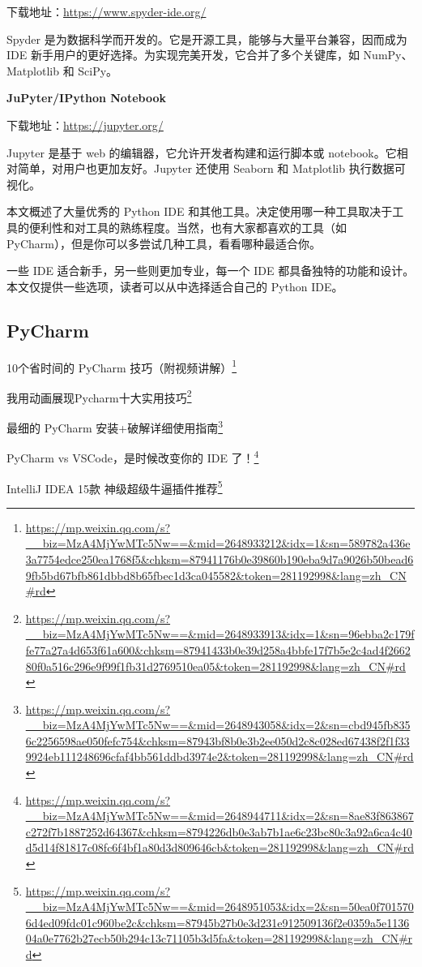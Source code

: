 \documentclass[]{ctexbook}
\renewcommand{\href}[2]{#2\footnote{\url{#1}}}
\begin{document}
下载地址：\url{https://www.spyder-ide.org/}

Spyder 是为数据科学而开发的。它是开源工具，能够与大量平台兼容，因而成为 IDE 新手用户的更好选择。为实现完美开发，它合并了多个关键库，如 NumPy、Matplotlib 和 SciPy。

\textbf{JuPyter/IPython Notebook}

下载地址：\url{https://jupyter.org/}

Jupyter 是基于 web 的编辑器，它允许开发者构建和运行脚本或 notebook。它相对简单，对用户也更加友好。Jupyter 还使用 Seaborn 和 Matplotlib 执行数据可视化。

本文概述了大量优秀的 Python IDE 和其他工具。决定使用哪一种工具取决于工具的便利性和对工具的熟练程度。当然，也有大家都喜欢的工具（如 PyCharm），但是你可以多尝试几种工具，看看哪种最适合你。

一些 IDE 适合新手，另一些则更加专业，每一个 IDE 都具备独特的功能和设计。本文仅提供一些选项，读者可以从中选择适合自己的 Python IDE。

\hypertarget{pycharm}{%
\subsection{PyCharm}\label{pycharm}}

\href{https://mp.weixin.qq.com/s?__biz=MzA4MjYwMTc5Nw==\&mid=2648933212\&idx=1\&sn=589782a436e3a7754edce250ea1768f5\&chksm=87941176b0e39860b190eba9d7a9026b50bead69fb5bd67bfb861dbbd8b65fbec1d3ca045582\&token=281192998\&lang=zh_CN\#rd}{10个省时间的 PyCharm 技巧（附视频讲解）}

\href{https://mp.weixin.qq.com/s?__biz=MzA4MjYwMTc5Nw==\&mid=2648933913\&idx=1\&sn=96ebba2c179ffe77a27a4d653f61a600\&chksm=87941433b0e39d258a4bbfe17f7b5e2c4ad4f266280f0a516c296e9f99f1fb31d2769510ea05\&token=281192998\&lang=zh_CN\#rd}{我用动画展现Pycharm十大实用技巧}

\href{https://mp.weixin.qq.com/s?__biz=MzA4MjYwMTc5Nw==\&mid=2648943058\&idx=2\&sn=cbd945fb8356c2256598ae050fefc754\&chksm=87943bf8b0e3b2ee050d2c8c028ed67438f2f1f339924eb111248696cfaf4bb561ddbd3974e2\&token=281192998\&lang=zh_CN\#rd}{最细的 PyCharm 安装+破解详细使用指南}

\href{https://mp.weixin.qq.com/s?__biz=MzA4MjYwMTc5Nw==\&mid=2648944711\&idx=2\&sn=8ae83f863867c272f7b1887252d64367\&chksm=8794226db0e3ab7b1ae6c23bc80c3a92a6ca4c40d5d14f81817c08fc6f4bf1a80d3d809646cb\&token=281192998\&lang=zh_CN\#rd}{PyCharm vs VSCode，是时候改变你的 IDE 了！}

\href{https://mp.weixin.qq.com/s?__biz=MzA4MjYwMTc5Nw==\&mid=2648951053\&idx=2\&sn=50ea0f7015706d4ed09fdc01c960be2c\&chksm=87945b27b0e3d231e912509136f2e0359a5e113604a0e7762b27ecb50b294c13c71105b3d5fa\&token=281192998\&lang=zh_CN\#rd}{IntelliJ IDEA 15款 神级超级牛逼插件推荐}
\end{document}
